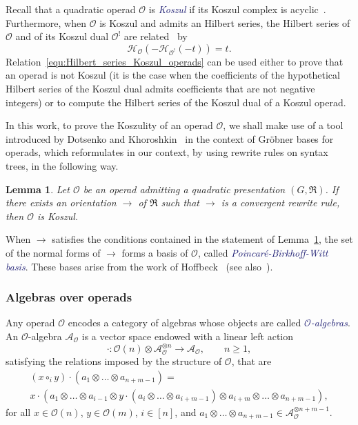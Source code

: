 \documentclass[10pt,reqno]{amsart}
\numberwithin{equation}{subsection}
\renewcommand{\geq}{\geqslant}
\newtheorem{Lemma}[Theorem]{Lemma}
\newcommand{\Aca}{\mathcal{A}}
\newcommand{\Oca}{\mathcal{O}}
\newcommand{\Hilbert}{\mathcal{H}}
\newcommand{\Rew}{\to}
\newcommand{\Rel}{\mathfrak{R}}
\newcommand{\Alg}{\Aca}
\newcommand{\Def}[1]{\textcolor{MidnightBlue}{\em #1}}
\begin{document}
Recall that a quadratic operad $\Oca$ is \Def{Koszul} if its Koszul
complex is acyclic~\cite{GK94,LV12}. Furthermore, when $\Oca$ is Koszul
and admits an Hilbert series, the Hilbert series of $\Oca$ and of its
Koszul dual $\Oca^!$ are related~\cite{GK94} by
\begin{equation} \label{equ:Hilbert_series_Koszul_operads}
    \Hilbert_\Oca\left(-\Hilbert_{\Oca^!}(-t)\right) = t.
\end{equation}
Relation~\eqref{equ:Hilbert_series_Koszul_operads} can be used either to
prove that an operad is not Koszul (it is the case when the coefficients
of the hypothetical Hilbert series of the Koszul dual admits
coefficients that are not negative integers) or to compute the Hilbert
series of the Koszul dual of a Koszul operad.
\medskip

In this work, to prove the Koszulity of an operad $\Oca$, we shall make
use of a tool introduced by Dotsenko and Khoroshkin~\cite{DK10} in the
context of Gröbner bases for operads, which reformulates in our context,
by using rewrite rules on syntax trees, in the following way.
\begin{Lemma} \label{lem:koszulity_criterion_pbw}
    Let $\Oca$ be an operad admitting a quadratic presentation
    $(G, \Rel)$. If there exists an orientation $\Rew$ of
    $\Rel$ such that $\Rew$ is a convergent rewrite rule, then
    $\Oca$ is Koszul.
\end{Lemma}
\medskip

When $\Rew$ satisfies the conditions contained in the statement of
Lemma~\ref{lem:koszulity_criterion_pbw}, the set of the normal forms of
$\Rew$ forms a basis of $\Oca$, called \Def{Poincaré-Birkhoff-Witt basis}.
These bases arise from the work of Hoffbeck~\cite{Hof10} (see
also~\cite{LV12}).
\medskip

\subsubsection{Algebras over operads}
Any operad $\Oca$ encodes a category of algebras whose objects are
called \Def{$\Oca$-algebras}. An $\Oca$-algebra $\Alg_\Oca$ is a vector
space endowed with a linear left action
\begin{equation}
    \cdot : \Oca(n) \otimes \Alg_\Oca^{\otimes n} \to \Alg_\Oca,
    \qquad n \geq 1,
\end{equation}
satisfying the relations imposed by the structure of $\Oca$, that are
\begin{multline} \label{equ:algebra_over_operad}
    (x \circ_i y) \cdot
    \left(a_1 \otimes \dots \otimes a_{n + m - 1}\right)
    = \\
    x \cdot \left(a_1 \otimes \dots
        \otimes a_{i - 1} \otimes
        y \cdot \left(a_i \otimes \dots \otimes a_{i + m - 1}\right)
        \otimes a_{i + m} \otimes
        \dots \otimes a_{n + m - 1}\right),
\end{multline}
for all $x \in \Oca(n)$, $y \in \Oca(m)$, $i \in [n]$, and
\begin{math}
    a_1 \otimes \dots \otimes a_{n + m - 1}
    \in \Alg_\Oca^{\otimes {n + m - 1}}.
\end{math}
\medskip
\end{document}
